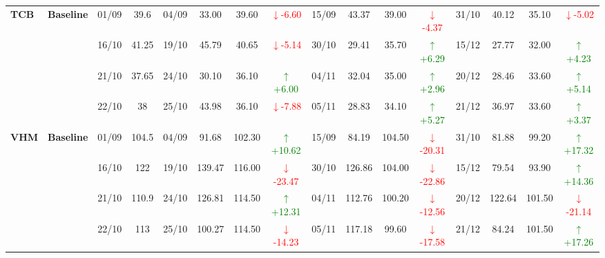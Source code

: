 {\begin{longtable}{llcc|cccc|cccc|cccc}
\multirow{4}{*}{\textbf{TCB}}
& \textbf{Baseline}
& 01/09 & 39.6 & 04/09 & 33.00 & 39.60 & \textcolor{red}{\(\downarrow\)-6.60} & 15/09 & 43.37 & 39.00 & \textcolor{red}{\(\downarrow\)-4.37} & 31/10 & 40.12 & 35.10 & \textcolor{red}{\(\downarrow\)-5.02} \\
& & 16/10 & 41.25 & 19/10 & 45.79 & 40.65 & \textcolor{red}{\(\downarrow\)-5.14} & 30/10 & 29.41 & 35.70 & \textcolor{green}{\(\uparrow\)+6.29} & 15/12 & 27.77 & 32.00 & \textcolor{green}{\(\uparrow\)+4.23} \\
& & 21/10 & 37.65 & 24/10 & 30.10 & 36.10 & \textcolor{green}{\(\uparrow\)+6.00} & 04/11 & 32.04 & 35.00 & \textcolor{green}{\(\uparrow\)+2.96} & 20/12 & 28.46 & 33.60 & \textcolor{green}{\(\uparrow\)+5.14} \\
& & 22/10 & 38 & 25/10 & 43.98 & 36.10 & \textcolor{red}{\(\downarrow\)-7.88} & 05/11 & 28.83 & 34.10 & \textcolor{green}{\(\uparrow\)+5.27} & 21/12 & 36.97 & 33.60 & \textcolor{green}{\(\uparrow\)+3.37} \\
\midrule

\multirow{4}{*}{\textbf{VHM}}
& \textbf{Baseline}
& 01/09 & 104.5 & 04/09 & 91.68 & 102.30 & \textcolor{green}{\(\uparrow\)+10.62} & 15/09 & 84.19 & 104.50 & \textcolor{red}{\(\downarrow\)-20.31} & 31/10 & 81.88 & 99.20 & \textcolor{green}{\(\uparrow\)+17.32} \\
& & 16/10 & 122 & 19/10 & 139.47 & 116.00 & \textcolor{red}{\(\downarrow\)-23.47} & 30/10 & 126.86 & 104.00 & \textcolor{red}{\(\downarrow\)-22.86} & 15/12 & 79.54 & 93.90 & \textcolor{green}{\(\uparrow\)+14.36} \\
& & 21/10 & 110.9 & 24/10 & 126.81 & 114.50 & \textcolor{green}{\(\uparrow\)+12.31} & 04/11 & 112.76 & 100.20 & \textcolor{red}{\(\downarrow\)-12.56} & 20/12 & 122.64 & 101.50 & \textcolor{red}{\(\downarrow\)-21.14} \\
& & 22/10 & 113 & 25/10 & 100.27 & 114.50 & \textcolor{red}{\(\downarrow\)-14.23} & 05/11 & 117.18 & 99.60 & \textcolor{red}{\(\downarrow\)-17.58} & 21/12 & 84.24 & 101.50 & \textcolor{green}{\(\uparrow\)+17.26} \\
\midrule


\end{longtable}}
